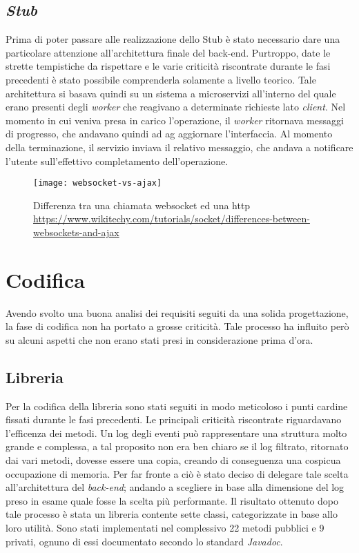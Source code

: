 \subsection{\textit{Stub}}
Prima di poter passare alle realizzazione dello Stub è stato necessario dare una particolare attenzione all'architettura finale del back-end. Purtroppo, date le strette tempistiche da rispettare e le varie criticità riscontrate durante le fasi precedenti è stato possibile comprenderla solamente a livello teorico. Tale architettura si basava quindi su un sistema a microservizi all'interno del quale erano presenti degli \textit{worker} che reagivano a determinate richieste lato \textit{client}. Nel momento in cui veniva presa in carico l'operazione, il \textit{worker} ritornava messaggi di progresso, che andavano quindi ad ag aggiornare l'interfaccia. Al momento della terminazione, il servizio inviava il relativo messaggio, che andava a notificare l'utente sull'effettivo completamento dell'operazione.\\


\begin{figure}[!h] 
	\centering 
	\texttt{[image: websocket-vs-ajax]} 
	\caption{Differenza tra una chiamata websocket ed una http \url{https://www.wikitechy.com/tutorials/socket/differences-between-websockets-and-ajax}}
\end{figure}

\section{Codifica}
Avendo svolto una buona analisi dei requisiti seguiti da una solida progettazione, la  fase di codifica non ha portato a grosse criticità. Tale processo ha influito però su alcuni aspetti che non erano stati presi in considerazione prima d'ora.
\subsection{Libreria}
Per la codifica della libreria sono stati seguiti in modo meticoloso i punti cardine fissati durante le fasi precedenti. Le principali criticità riscontrate riguardavano l'efficenza dei metodi. Un log degli eventi può rappresentare una struttura molto grande e complessa, a tal proposito non era ben chiaro se il log filtrato, ritornato dai vari metodi, dovesse essere una copia, creando di conseguenza una cospicua occupazione di memoria. Per far fronte a ciò è stato deciso di delegare tale scelta all'architettura del \textit{back-end}; andando a scegliere in base alla dimensione del log preso in esame quale fosse la scelta più performante. Il risultato ottenuto dopo tale processo è stata un libreria contente sette classi, categorizzate in base allo loro utilità. Sono stati implementati nel complessivo 22 metodi pubblici e 9 privati, ognuno di essi documentato secondo lo standard \textit{Javadoc}.
